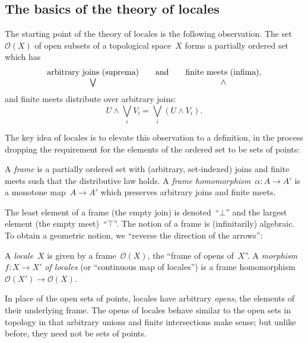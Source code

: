 \documentclass{ws-rv9x6}
\renewcommand{\O}{\mathcal{O}}
\renewcommand{\_}{\mathpunct{.}}
\newcommand{\?}{\,{:}\,}
\begin{document}
\subsection{The basics of the theory of locales}

The starting point of the theory of locales is the following
observation. The set~$\O(X)$ of open subsets of a topological
space~$X$ forms a partially ordered set which has
\[ \begin{array}{@{}ccc@{}}
\text{arbitrary joins (suprema)}
&\quad\text{and}\quad&
\text{finite meets (infima)}, \\
\bigvee && \wedge
\end{array} \]
and finite meets distribute over arbitrary joins:
\[ U \wedge \bigvee_i V_i = \bigvee_i (U \wedge V_i). \]

The key idea of locales is to elevate this observation to a definition, in the
process dropping the requirement for the elements of the ordered set to be sets
of points:
\begin{definition}A \emph{frame} is a partially ordered set with (arbitrary,
set-indexed) joins and finite meets such that the distributive law
holds. A \emph{frame homomorphism~$\alpha : A \to A'$} is a monotone map~$A
\to A'$ which preserves arbitrary joins and finite meets.\end{definition}

The least element of a frame (the empty join) is denoted~``$\bot$'' and the
largest element (the empty meet)~``$\top$''. The notion of a frame is
(infinitarily) algebraic. To obtain a geometric notion, we ``reverse the
direction of the arrows'':

\begin{definition}\label{defn:locale}
A \emph{locale}~$X$ is given by a frame~$\O(X)$, the ``frame
of opens of~$X$''. A \emph{morphism~$f : X \to X'$ of locales} (or ``continuous
map of locales'') is a frame homomorphism~$\O(X') \to \O(X)$.\end{definition}

In place of the open sets of points, locales have arbitrary \emph{opens}, the
elements of their underlying frame. The opens of locales behave similar to the
open sets in topology in that arbitrary unions and finite intersections make
sense; but unlike before, they need not be sets of points.
\end{document}
